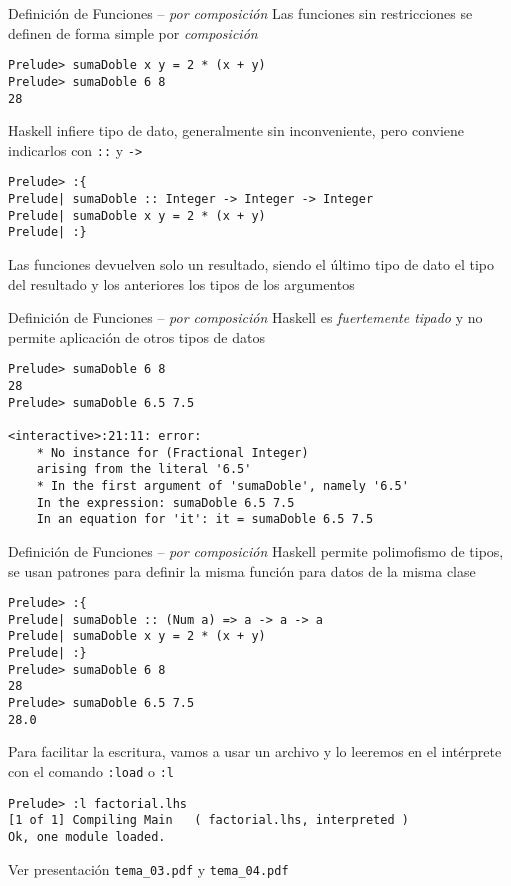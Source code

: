 \begin{frame}[fragile]{Definición de Funciones -- \emph{por composición}}
    Las funciones sin restricciones se definen de forma simple por \emph{composición}
    \begin{lstlisting}[style=consola]
Prelude> sumaDoble x y = 2 * (x + y)
Prelude> sumaDoble 6 8
28
    \end{lstlisting}
    Haskell infiere tipo de dato, generalmente sin inconveniente,
    pero conviene indicarlos con \verb|::| y \verb|->| 
    \begin{lstlisting}[style=consola]
Prelude> :{
Prelude| sumaDoble :: Integer -> Integer -> Integer
Prelude| sumaDoble x y = 2 * (x + y)
Prelude| :}
    \end{lstlisting}
    Las funciones devuelven solo un resultado, siendo el último tipo de dato el tipo del resultado y los anteriores los tipos de los argumentos
\end{frame}

\begin{frame}[fragile]{Definición de Funciones -- \emph{por composición}}
    Haskell es \emph{fuertemente tipado} y no permite aplicación de otros tipos de datos
    \begin{lstlisting}[style=consola]
Prelude> sumaDoble 6 8
28
Prelude> sumaDoble 6.5 7.5

<interactive>:21:11: error:
    * No instance for (Fractional Integer)
    arising from the literal '6.5'
    * In the first argument of 'sumaDoble', namely '6.5'
    In the expression: sumaDoble 6.5 7.5
    In an equation for 'it': it = sumaDoble 6.5 7.5
    \end{lstlisting}
\end{frame}

\begin{frame}[fragile]{Definición de Funciones -- \emph{por composición}}
    Haskell permite polimofismo de tipos, se usan patrones para
    definir la misma función para datos de la misma clase
    \begin{lstlisting}[style=consola]
Prelude> :{
Prelude| sumaDoble :: (Num a) => a -> a -> a
Prelude| sumaDoble x y = 2 * (x + y)
Prelude| :}
Prelude> sumaDoble 6 8
28
Prelude> sumaDoble 6.5 7.5
28.0
    \end{lstlisting}
    Para facilitar la escritura, vamos a usar un archivo y lo leeremos en el intérprete con el comando \verb|:load| o \verb|:l|
    \begin{lstlisting}[style=consola]
Prelude> :l factorial.lhs 
[1 of 1] Compiling Main   ( factorial.lhs, interpreted )
Ok, one module loaded.
    \end{lstlisting}
    Ver presentación \verb|tema_03.pdf| y \verb|tema_04.pdf|
\end{frame}

